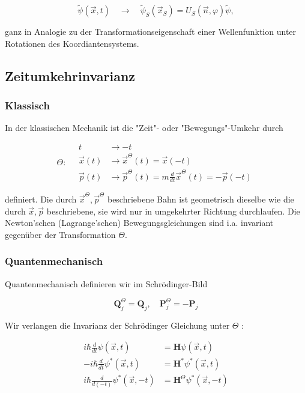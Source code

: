 \documentclass[10pt, letterpaper]{article}
\begin{document}
$$
\tilde{\psi}(\vec{x}, t) \quad \rightarrow \quad \tilde{\psi}_{S}\left(\vec{x}_{S}\right)=U_{S}(\vec{n}, \varphi) \tilde{\psi},
$$

ganz in Analogie zu der Transformationseigenschaft einer Wellenfunktion unter Rotationen des Koordiantensystems.

\subsection*{Zeitumkehrinvarianz}
\subsubsection*{Klassisch}
In der klassischen Mechanik ist die "Zeit"- oder "Bewegungs"-Umkehr durch

$$
\Theta: \quad \begin{aligned}
t & \rightarrow-t \\
\vec{x}(t) & \rightarrow \vec{x}^{\Theta}(t)=\vec{x}(-t) \\
\vec{p}(t) & \rightarrow \vec{p}^{\Theta}(t)=m \frac{d}{d t} \vec{x}^{\Theta}(t)=-\vec{p}(-t)
\end{aligned}
$$

definiert. Die durch $\vec{x}^{\Theta}, \vec{p}^{\Theta}$ beschriebene Bahn ist geometrisch dieselbe wie die durch $\vec{x}, \vec{p}$ beschriebene, sie wird nur in umgekehrter Richtung durchlaufen. Die Newton'schen (Lagrange'schen) Bewegungsgleichungen sind i.a. invariant gegenüber der Transformation $\Theta$.

\subsubsection*{Quantenmechanisch}
Quantenmechanisch definieren wir im Schrödinger-Bild

$$
\mathbf{Q}_{j}^{\Theta}=\mathbf{Q}_{j}, \quad \mathbf{P}_{j}^{\Theta}=-\mathbf{P}_{j}
$$

Wir verlangen die Invarianz der Schrödinger Gleichung unter $\Theta$ :

$$
\begin{aligned}
i \hbar \frac{d}{d t} \psi(\vec{x}, t) & =\mathbf{H} \psi(\vec{x}, t) \\
-i \hbar \frac{d}{d t} \psi^{*}(\vec{x}, t) & =\mathbf{H}^{*} \psi^{*}(\vec{x}, t) \\
i \hbar \frac{d}{d(-t)} \psi^{*}(\vec{x},-t) & =\mathbf{H}^{\Theta} \psi^{*}(\vec{x},-t)
\end{aligned}
$$
\end{document}
